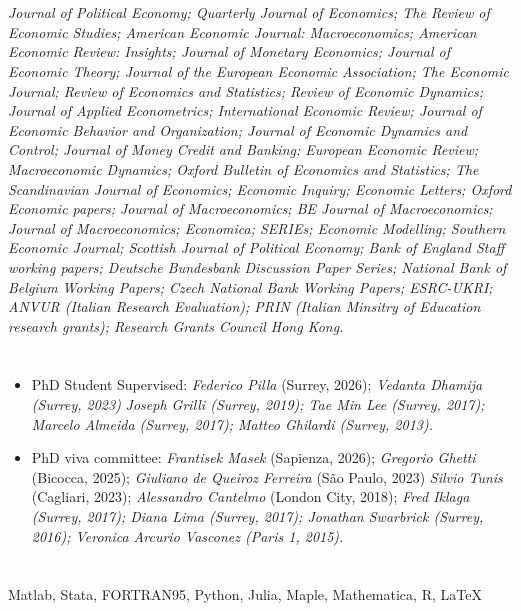 \documentclass[margin, 11pt]{res} %
\begin{document}
\begin{resume}
\section{}
\emph{Journal of Political Economy; Quarterly Journal of Economics; The Review of Economic Studies; American Economic Journal: Macroeconomics; American Economic Review: Insights; Journal of Monetary Economics; Journal of Economic Theory; Journal of the European Economic Association; The Economic Journal; Review of Economics and Statistics; Review of Economic Dynamics; Journal of Applied Econometrics; International Economic Review; Journal of Economic Behavior and Organization; Journal of Economic Dynamics and Control; Journal of Money Credit and Banking; European Economic Review; Macroeconomic Dynamics; Oxford Bulletin of Economics and Statistics; The Scandinavian Journal of Economics; Economic Inquiry; Economic Letters; Oxford Economic papers; Journal of Macroeconomics; BE Journal of Macroeconomics; Journal of Macroeconomics; Economica; SERIEs; Economic Modelling; Southern Economic Journal; Scottish Journal of Political Economy; Bank of England Staff working papers; Deutsche Bundesbank Discussion Paper Series; National Bank of Belgium Working Papers; Czech National Bank Working Papers; ESRC-UKRI; ANVUR (Italian Research Evaluation); PRIN (Italian Minsitry of Education research grants);  Research Grants Council Hong Kong.}


\section{}
\begin{itemize}
\item PhD Student Supervised: \emph{Federico Pilla} (Surrey, 2026); \emph{Vedanta Dhamija (Surrey, 2023)} \emph{Joseph Grilli (Surrey, 2019); Tae Min Lee (Surrey, 2017); Marcelo Almeida (Surrey, 2017); Matteo Ghilardi (Surrey, 2013).}
\item PhD viva committee: \emph{Frantisek Masek} (Sapienza, 2026); \emph{Gregorio Ghetti} (Bicocca, 2025); \emph{Giuliano de Queiroz Ferreira} (S\~ao Paulo, 2023) \emph{Silvio Tunis} (Cagliari, 2023); \emph{Alessandro Cantelmo} (London City, 2018); \emph{Fred Iklaga (Surrey, 2017); Diana Lima (Surrey, 2017); Jonathan Swarbrick (Surrey, 2016); Veronica Arcurio Vasconez (Paris 1, 2015).}
\end{itemize}


\section{}
Matlab, Stata, FORTRAN95, Python, Julia, Maple, Mathematica, R, \LaTeX\\


\end{resume}
\end{document}
